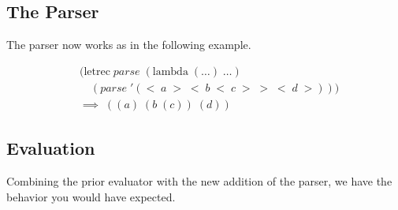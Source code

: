 \subsection{The Parser}
The parser now works as in the following example.

\begin{figure}[ht]
\caption{}\label{scheme}
\begin{align*}
& (\text{letrec} \; parse \; (\text{lambda} \; (\dots) \; \dots)
\\& \quad (parse \; '(< \; a \; > \; < \; b \; < \; c \; > \; > \; < \; d \; >)))
\\& \implies \; ((a) \; (b \; (c)) \; (d))
\end{align*}
\end{figure}

\subsection{Evaluation}
Combining the prior evaluator with the new addition of the parser, we have the behavior you would have expected.
